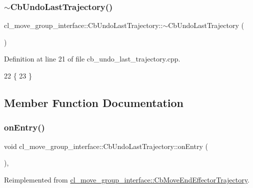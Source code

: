 \subsubsection{\texorpdfstring{$\sim$\+Cb\+Undo\+Last\+Trajectory()}{~CbUndoLastTrajectory()}}
{\footnotesize\ttfamily cl\+\_\+move\+\_\+group\+\_\+interface\+::\+Cb\+Undo\+Last\+Trajectory\+::$\sim$\+Cb\+Undo\+Last\+Trajectory (\begin{DoxyParamCaption}{ }\end{DoxyParamCaption})\hspace{0.3cm}{\ttfamily [virtual]}}



Definition at line 21 of file cb\+\_\+undo\+\_\+last\+\_\+trajectory.\+cpp.


\begin{DoxyCode}
22     \{
23     \}
\end{DoxyCode}


\subsection{Member Function Documentation}
\mbox{\label{classcl__move__group__interface_1_1CbUndoLastTrajectory_a3c55fa93ff65d8eccb8cc14a420cb7b2}} 
\subsubsection{\texorpdfstring{on\+Entry()}{onEntry()}}
{\footnotesize\ttfamily void cl\+\_\+move\+\_\+group\+\_\+interface\+::\+Cb\+Undo\+Last\+Trajectory\+::on\+Entry (\begin{DoxyParamCaption}{ }\end{DoxyParamCaption})\hspace{0.3cm}{\ttfamily [override]}, {\ttfamily [virtual]}}



Reimplemented from \hyperlink{classcl__move__group__interface_1_1CbMoveEndEffectorTrajectory_aaedd074fd178c6390a4a3f1ccff23ad3}{cl\+\_\+move\+\_\+group\+\_\+interface\+::\+Cb\+Move\+End\+Effector\+Trajectory}.



